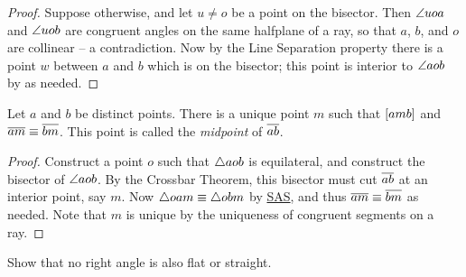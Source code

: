 \begin{proof}
Suppose otherwise, and let \(u \neq o\) be a point on the bisector.
Then \(\angle{uoa}\) and \(\angle{uob}\) are congruent angles on the same halfplane of a ray, so that \(a\), \(b\), and \(o\) are collinear -- a contradiction.
Now by the Line Separation property there is a point \(w\) between \(a\) and \(b\) which is on the bisector; this point is interior to \(\angle{aob}\) by  as needed.
\end{proof}

\begin{construct}
Let \(a\) and \(b\) be distinct points.
There is a unique point \(m\) such that \([ a m b ]\) and \(\overline{am} \equiv \overline{bm}\).
This point is called the \emph{midpoint} of \(\overline{ab}\).
\end{construct}

\begin{proof}
Construct a point \(o\) such that \(\bigtriangleup{aob}\) is equilateral, and construct the bisector of \(\angle{aob}\).
By the Crossbar Theorem, this bisector must cut \(\overline{ab}\) at an interior point, say \(m\).
Now \(\bigtriangleup{oam} \equiv \bigtriangleup{obm}\) by \hyperref[prop:sas-theorem]{SAS}, and thus \(\overline{am} \equiv \overline{bm}\) as needed.
Note that \(m\) is unique by the uniqueness of congruent segments on a ray.
\end{proof}



\Exercises%

\begin{exercise}
Show that no right angle is also flat or straight.
\end{exercise}
